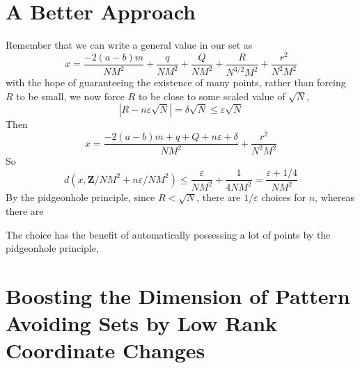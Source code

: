 \documentclass{report}
\theoremstyle{plain}
\theoremstyle{plain}
\begin{document}
\section{A Better Approach}

Remember that we can write a general value in our set as
%
\[ x = \frac{-2(a-b)m}{NM^2} + \frac{q}{NM^2} + \frac{Q}{NM^2} + \frac{R}{N^{3/2} M^2} + \frac{r^2}{N^2M^2} \]
%
with the hope of guaranteeing the existence of many points, rather than forcing $R$ to be small, we now force $R$ to be close to some scaled value of $\sqrt{N}$, 
%
\[ |R - n \varepsilon \sqrt{N}| = \delta \sqrt{N} \leq \varepsilon \sqrt{N} \]
%
Then
%
\[ x = \frac{-2(a-b)m + q + Q + n\varepsilon + \delta}{NM^2} + \frac{r^2}{N^2M^2} \]
%
So
%
\[ d \left( x, \mathbf{Z}/NM^2 + n\varepsilon / NM^2 \right) \leq \frac{\varepsilon}{NM^2} + \frac{1}{4NM^2} = \frac{\varepsilon + 1/4}{NM^2} \]
%
By the pidgeonhole principle, since $R < \sqrt{N}$, there are $1/\varepsilon$ choices for $n$, whereas there are


The choice has the benefit of automatically possessing a lot of points by the pidgeonhole principle,

\section{Boosting the Dimension of Pattern Avoiding Sets by Low Rank Coordinate Changes}
\end{document}
